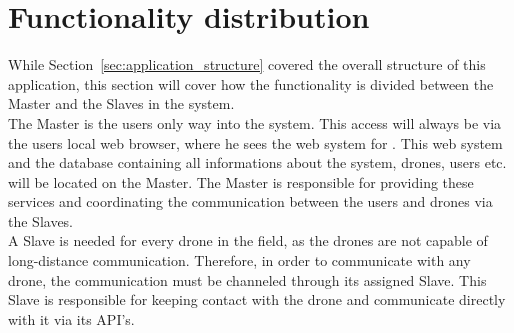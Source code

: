 \section{Functionality distribution}

While Section~\ref{sec:application_structure} covered the overall structure of this application, this section will cover how the functionality is divided between the Master and the Slaves in the system. \\

The Master is the users only way into the system. 
This access will always be via the users local web browser, where he sees the web system for \projectname{}.
This web system and the database containing all informations about the system, drones, users etc. will be located on the Master. 
The Master is responsible for providing these services and coordinating the communication between the users and drones via the Slaves. \\

A Slave is needed for every drone in the field, as the drones are not capable of long-distance communication. 
Therefore, in order to communicate with any drone, the communication must be channeled through its assigned Slave. 
This Slave is responsible for keeping contact with the drone and communicate directly with it via its API's. 


